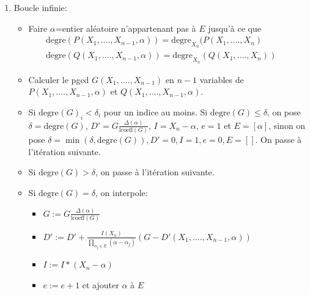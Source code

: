 \documentclass[a4paper,11pt]{article}
\begin{document}
\begin{giacjshere}
\begin{enumerate}
  \item Boucle infinie:
  \begin{itemize}
    \item Faire $\alpha$=entier aléatoire n'appartenant pas à $E$ jusqu'à ce
    que
    \begin{eqnarray*}
      \mbox{degre}(P ( X_1, \ldots ., X_{n - 1}, \alpha
      ))=\mbox{degre}_{X_n} ( P ( X_1, \ldots ., X_n ) &  & \\
      \mbox{degre} ( Q ( X_1, \ldots ., X_{n - 1}, \alpha )) =
      \mbox{degre}_{X_n} ( Q ( X_1, \ldots ., X_n )) &  & 
    \end{eqnarray*}
    \item Calculer le pgcd $G ( X_1, \ldots ., X_{n - 1} )$ en $n - 1$
    variables de $P ( X_1, \ldots ., X_{n - 1}, \alpha )$ et $Q ( X_1, \ldots
    ., X_{n - 1}, \alpha )$.
    
    \item Si $\mbox{degre}_{} ( G )_i < \delta_i$ pour un indice au moins.
    Si $\mbox{degre} ( G ) \leq \delta$, on pose $\delta =
    \mbox{degre} ( G )$, $D' = G \frac{\Delta ( \alpha )}{\mbox{lcoeff} ( G
    )}$, $I = X_n - \alpha$, $e = 1$ et $E = [ \alpha ]$, sinon on pose $\delta
    = \min ( \delta, \mbox{degre} ( G )), D' = 0, I = 1, e = 0, E = [ ]$.
    On passe à l'itération suivante.

    \item Si $\mbox{degre} ( G ) > \delta$, on passe à l'itération suivante.
    
    \item Si $\mbox{degre} ( G ) = \delta$, on interpole:
    \begin{itemize}
      \item $G := G \frac{\Delta ( \alpha )}{\mbox{lcoeff} ( G )}$
      
      \item $D' := D' + \frac{I ( X_n )}{\prod_{\alpha_j \in E} ( \alpha -
      \alpha_j )} ( G - D' ( X_1, \ldots ., X_{n - 1}, \alpha ))$
      
      \item $I := I \ast ( X_n - \alpha )$
      
      \item $e := e + 1$ et ajouter $\alpha$ à $E$
      

\end{itemize}
\end{itemize}
\end{enumerate}
\end{giacjshere}
\end{document}
